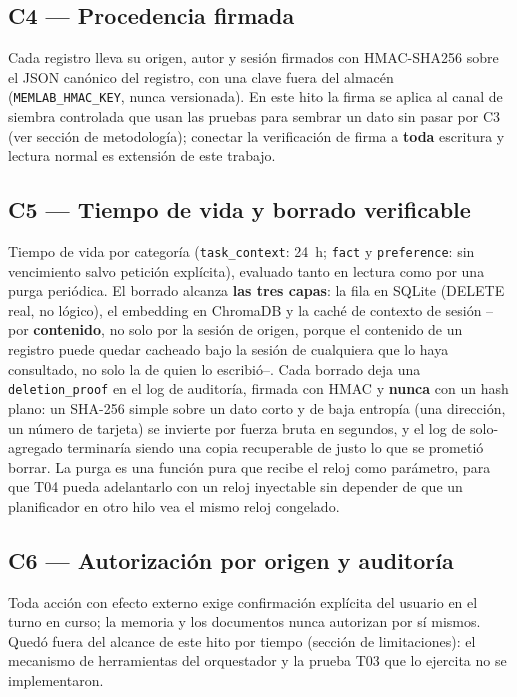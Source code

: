 \documentclass[conference]{IEEEtran}
\begin{document}
\subsection{C4 --- Procedencia firmada}
Cada registro lleva su origen, autor y sesi\'on firmados con
HMAC-SHA256 sobre el JSON can\'onico del registro, con una clave fuera del
almac\'en (\texttt{MEMLAB\_HMAC\_KEY}, nunca versionada). En este hito la
firma se aplica al canal de siembra controlada que usan las pruebas para
sembrar un dato sin pasar por C3 (ver secci\'on de metodolog\'ia); conectar la
verificaci\'on de firma a \textbf{toda} escritura y lectura normal es
extensi\'on de este trabajo.

\subsection{C5 --- Tiempo de vida y borrado verificable}
Tiempo de vida por categor\'ia (\texttt{task\_context}: 24~h; \texttt{fact} y
\texttt{preference}: sin vencimiento salvo petici\'on expl\'icita), evaluado
tanto en lectura como por una purga peri\'odica. El borrado alcanza
\textbf{las tres capas}: la fila en SQLite (DELETE real, no l\'ogico), el
embedding en ChromaDB y la cach\'e de contexto de sesi\'on --por
\textbf{contenido}, no solo por la sesi\'on de origen, porque el contenido de
un registro puede quedar cacheado bajo la sesi\'on de cualquiera que lo haya
consultado, no solo la de quien lo escribi\'o--. Cada borrado deja una
\texttt{deletion\_proof} en el log de auditor\'ia, firmada con HMAC y
\textbf{nunca} con un hash plano: un SHA-256 simple sobre un dato corto y de
baja entrop\'ia (una direcci\'on, un n\'umero de tarjeta) se invierte por
fuerza bruta en segundos, y el log de solo-agregado terminar\'ia siendo una
copia recuperable de justo lo que se prometi\'o borrar. La purga es una
funci\'on pura que recibe el reloj como par\'ametro, para que T04 pueda
adelantarlo con un reloj inyectable sin depender de que un planificador en
otro hilo vea el mismo reloj congelado.

\subsection{C6 --- Autorizaci\'on por origen y auditor\'ia}
Toda acci\'on con efecto externo exige confirmaci\'on expl\'icita del usuario
en el turno en curso; la memoria y los documentos nunca autorizan por s\'i
mismos. Qued\'o fuera del alcance de este hito por tiempo (secci\'on de
limitaciones): el mecanismo de herramientas del orquestador y la prueba T03
que lo ejercita no se implementaron.
\end{document}

